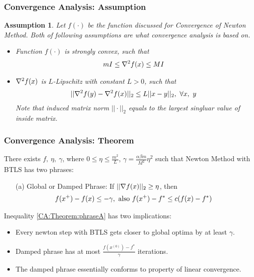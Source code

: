 \documentclass{beamer}
\newcommand{\be}{\begin{eqnarray}}
\newcommand{\ee}{\end{eqnarray}}
\newtheorem{assumption}{Assumption}
\begin{document}
\begin{frame}
    \frametitle{Convergence Analysis: Assumption}    
    \begin{assumption}
        Let $f(\cdot)$ be the function discussed for Convergence of Newton
        Method. Both of following assumptions are what convergence analysis is
        based on.
        \begin{itemize}
            \item Function $f(\cdot)$ is strongly convex, such that
        \be
        m I \leq \fhess \leq M I
        \ee
    \item $\nabla^2 f(x)$ is $L$-Lipschitz with constant $L > 0$, such that
        \be
        || \hessian{}{f}{y} - \hessian{}{f}{x} ||_2 \leq L ||x-y||_2,\ 
        \forall x,\ y
        \ee
        Note that induced matrix norm $|| \cdot ||_2$ equals to the largest
        singluar value of inside matrix.
        \end{itemize}
    \end{assumption}
\end{frame}

\begin{frame}
    \frametitle{Convergence Analysis: Theorem}    
    \begin{theorem}[Part I]
        There exists $f,\ \eta,\ \gamma$, where $ 0 \leq \eta \leq \frac{m^2}{L}$,
        $\gamma = \frac{\alpha \beta m}{M^2}\eta^2$
        such that Newton Method with BTLS has two phrases: 
        \begin{itemize}
            \item[(a)] Global or Damped Phrase: If $||\nabla f(x)||_2 \geq \eta$, then 
                \be
                f(\xp) - f(x) \leq -\gamma, \text{ also } 
                f(\xp) - f^* \leq c(f(x)-f^*) \label{CA:Theorem:phraseA}
                \ee
        \end{itemize}
    \end{theorem}
        Inequality \eqref{CA:Theorem:phraseA} has two implications: 
        \begin{itemize}
            \item Every newton step with BTLS gets closer to global optima by
                at least $\gamma$.
            \item Damped phrase has at most $\frac{f(x^{(0)}) -
                    f^{*}}{\gamma}$ iterations.
            \item The damped phrase essentially conforms to property of linear convergence.
        \end{itemize}
\end{frame}
\end{document}
